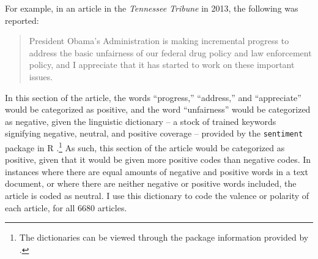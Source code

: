 For example, in an article in the \textit{Tennessee Tribune} in 2013, the following was reported: 

\begin{quote}
President Obama's Administration is making incremental progress to address the basic unfairness of our federal drug policy and law enforcement policy, and I appreciate that it has started to work on these important issues.
\end{quote}

In this section of the article, the words ``progress,'' ``address,'' and ``appreciate'' would be categorized as positive, and the word ``unfairness'' would be categorized as negative, given the linguistic dictionary -- a stock of trained keywords signifying negative, neutral, and positive coverage -- provided by the \texttt{sentiment} package in \textsf{R} \citep{jurka_2012}.\footnote{The dictionaries can be viewed through the package information provided by \citet{jurka_2012}.} As such, this section of the article would be categorized as positive, given that it would be given more positive codes than negative codes. In instances where there are equal amounts of negative and positive words in a text document, or where there are neither negative or positive words included, the article is coded as neutral. I use this dictionary to code the valence or polarity of each article, for all 6680 articles. 







